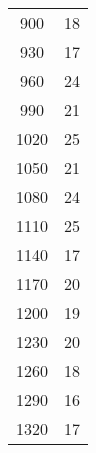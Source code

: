 \begin{table}[H]
\begin{tabular}{S S}
        900	& 18 \\
        930	& 17 \\
        960	& 24 \\
        990	& 21 \\
       1020 &	25  \\
       1050 &	21 \\
       1080 &	24 \\
       1110 &	25 \\
       1140 &	17 \\
       1170 &	20 \\
       1200 &	19 \\
       1230 &	20 \\
       1260 &	18 \\
       1290 &	16 \\
       1320 &	17 \\
      \bottomrule
    \end{tabular}
  \end{table}
